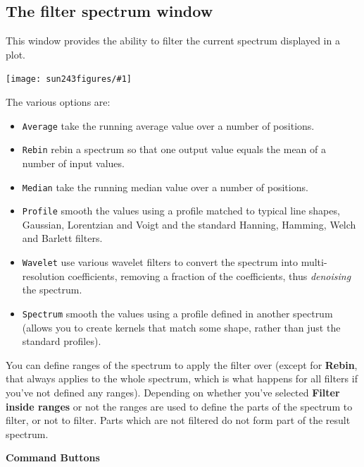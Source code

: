 \documentclass[twoside,11pt]{article}
\newcommand{\htmladdimg}[1]{}
\newcommand{\latexhtml}[2]{#1}
\renewcommand{\_}{\texttt{\symbol{95}}}
\newcommand{\mainfigure}[1]
{\begin{center}
 \latexhtml{\texttt{[image: sun243\_figures/\#1]}}{\htmladdimg{#1.gif}}
 \end{center}
}
\newcommand{\labelitem}[1]{\textbf{#1}}
\newcommand{\hitext}[1]{\texttt{#1}}
\newcommand{\subheading}[1]{\textbf{\large{#1}}}
\begin{document}
\newpage
\subsection{The filter spectrum window}

This window provides the ability to filter the current spectrum
displayed in a plot.

\mainfigure{filterwindow}

The various options are:
\begin{itemize}
  \item \hitext{Average} take the running average value over a
        number of positions.
  \item \hitext{Rebin} rebin a spectrum so that one output value
        equals the mean of a number of input values.
  \item \hitext{Median} take the running median value over a
        number of positions.
  \item \hitext{Profile} smooth the values using a profile matched
        to typical line shapes, Gaussian, Lorentzian and Voigt and
        the standard Hanning, Hamming, Welch and Barlett filters.
  \item \hitext{Wavelet} use various wavelet filters to convert the
        spectrum into multi-resolution coefficients, removing a
        fraction of the coefficients, thus \textit{denoising} the
        spectrum.
  \item \hitext{Spectrum} smooth the values using a profile
        defined in another spectrum (allows you to create kernels
        that match some shape, rather than just the standard profiles).
\end{itemize}

You can define ranges of the spectrum to apply the filter over (except for
\labelitem{Rebin}, that always applies to the whole spectrum, which is what
happens for all filters if you've not defined any ranges).  Depending on
whether you've selected \labelitem{Filter inside ranges} or not the ranges are
used to define the parts of the spectrum to filter, or not to filter. Parts
which are not filtered do not form part of the result spectrum.

\subheading{Command Buttons}
\end{document}
